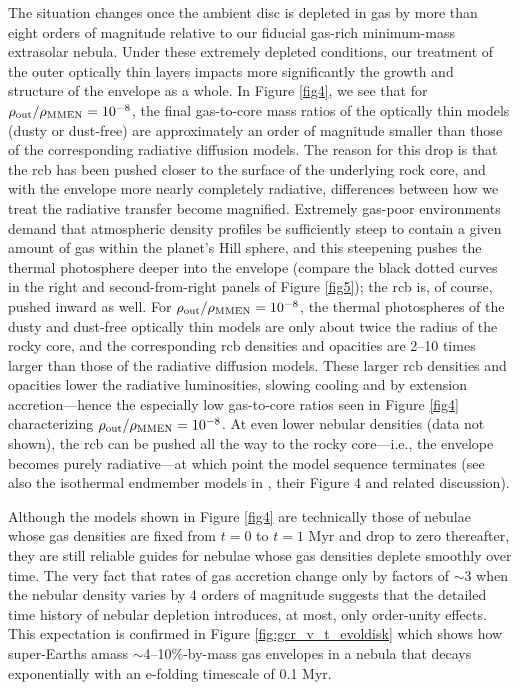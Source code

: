 \documentclass[fleqn,useAMS,usenatbib]{mnras}
\begin{document}
The situation changes once the ambient disc
is depleted in gas by more than eight orders of magnitude
relative to our fiducial gas-rich minimum-mass extrasolar nebula.
Under these extremely depleted conditions,
our treatment of the outer optically thin layers impacts more significantly
the growth and structure of the envelope as a whole.
In Figure \ref{fig4}, we see that for $\rho_{\rm out}/\rho_{\rm MMEN} = 10^{-8}$,
the final gas-to-core mass ratios
of the optically thin models (dusty or dust-free)
are approximately an order of magnitude
smaller than those of the corresponding radiative diffusion models. 
The reason for this drop is that the rcb has been pushed closer
to the surface of the underlying rock core, and with the envelope
more nearly completely radiative, differences between how we
treat the radiative transfer become magnified.
Extremely gas-poor environments
demand that atmospheric density profiles be sufficiently steep
to contain a given amount of gas within the planet's Hill sphere,
and this steepening pushes the thermal photosphere deeper into the envelope 
(compare the black dotted
curves in the right and second-from-right panels of Figure \ref{fig5});
the rcb is, of course, pushed inward as well.
For $\rho_{\rm out}/\rho_{\rm MMEN} = 10^{-8}$, the thermal photospheres
of the dusty and dust-free optically thin models
are only about twice the radius of the rocky core,
and the corresponding rcb densities and opacities are
2--10 times larger than those of the radiative diffusion models.
These larger rcb densities and opacities lower the radiative luminosities,
slowing cooling and by extension accretion---hence the especially low
gas-to-core ratios seen in Figure \ref{fig4}
characterizing $\rho_{\rm out}/\rho_{\rm MMEN} = 10^{-8}$. 
At even lower nebular densities (data not shown),
the rcb can be pushed all the way to the rocky core---i.e., the envelope
becomes purely radiative---at which point the model sequence terminates
(see also the isothermal endmember models in \citealt{paper2}, their Figure 4
and related discussion).

Although the models shown in Figure \ref{fig4} are technically
  those of nebulae whose gas densities are fixed from $t = 0$ to
  $t = 1$ Myr and drop to zero thereafter, they are still reliable
  guides for nebulae whose gas densities deplete smoothly over
  time. The very fact that rates of gas accretion change only by
  factors of $\sim$3 when the nebular density varies by 4 orders of
  magnitude suggests that the detailed time history of nebular
  depletion introduces, at most, only order-unity effects. This expectation is
  confirmed in Figure \ref{fig:gcr_v_t_evoldisk} which shows how
super-Earths amass $\sim$4--10\%-by-mass
gas envelopes in a nebula that decays exponentially with an
e-folding timescale of 0.1 Myr.
\end{document}
